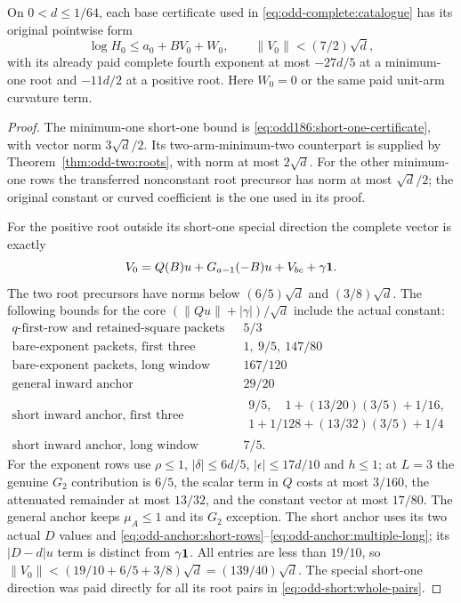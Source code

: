 \begin{lemma}
\label{lem:odd-complete:vector-cap}
On $0<d\le1/64$, each base certificate used in
\eqref{eq:odd-complete:catalogue} has its original pointwise form
\[
 \log H_0\le a_0+BV_0+W_0,
 \qquad\|V_0\|<(7/2)\sqrt d,
\]
with its already paid complete fourth exponent at most
$-27d/5$ at a minimum-one root and $-11d/2$ at a positive root.
Here $W_0=0$ or the same paid unit-arm curvature term.
\end{lemma}
\begin{proof}
The minimum-one short-one bound is
\eqref{eq:odd186:short-one-certificate}, with vector norm
$3\sqrt d/2$. Its two-arm-minimum-two counterpart is supplied
by Theorem~\ref{thm:odd-two:roots}, with norm at most $2\sqrt d$.
For the other minimum-one rows the transferred nonconstant root
precursor has norm at most $\sqrt d/2$; the original constant
or curved coefficient is the one used in its proof.

For the positive root outside its short-one special direction the
complete vector is exactly
\[
 V_0=Q(B)u+G_{a-1}(-B)u+V_{bc}+\gamma\mathbf1.
\]
The two root precursors have norms below
$(6/5)\sqrt d$ and $(3/8)\sqrt d$.
The following bounds for the core
$(\|Qu\|+|\gamma|)/\sqrt d$ include the actual constant:
\[
\begin{array}{c|c}
 q\text{-first-row and retained-square packets}&5/3\\
 \text{bare-exponent packets, first three windows}
          &1,\ 9/5,\ 147/80\\
 \text{bare-exponent packets, long window}&167/120\\
 \text{general inward anchor}&29/20\\
 \text{short inward anchor, first three windows}
          &\begin{gathered}9/5,\quad1+(13/20)(3/5)+1/16,\\
             1+1/128+(13/32)(3/5)+1/4\end{gathered}\\
 \text{short inward anchor, long window}&7/5.
\end{array}
\]
For the exponent rows use $\rho\le1$,
$|\delta|\le6d/5$, $|\epsilon|\le17d/10$ and $h\le1$;
at $L=3$ the genuine $G_2$ contribution is $6/5$, the scalar
term in $Q$ costs at most $3/160$, the attenuated remainder
at most $13/32$, and the constant vector at most $17/80$.
The general anchor keeps $\mu_A\le1$ and its $G_2$ exception.
The short anchor uses its two actual $D$ values and
\eqref{eq:odd-anchor:short-rows}--\eqref{eq:odd-anchor:multiple-long};
its $|D-d|u$ term is distinct from $\gamma\mathbf1$.
All entries are less than $19/10$, so
$\|V_0\|<(19/10+6/5+3/8)\sqrt d=(139/40)\sqrt d$.
The special short-one direction was paid directly for all its
root pairs in \eqref{eq:odd-short:whole-pairs}.
\end{proof}

